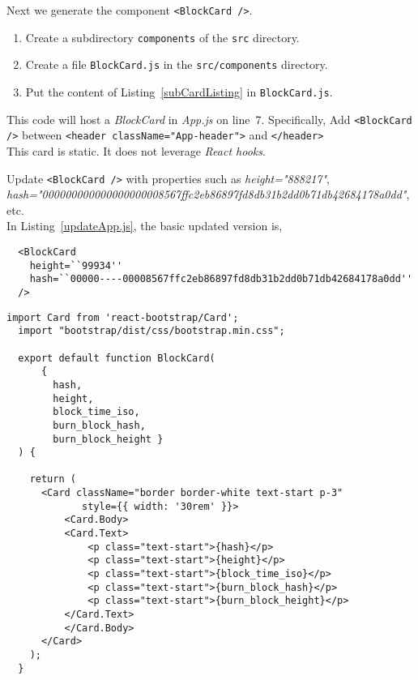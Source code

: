 \documentclass[12pt]{article}
\begin{document}
Next we generate the component \lstinline[style=JSES6Base]|<BlockCard />|.

\begin{enumerate}

  \item Create a subdirectory \lstinline[language=bash]|components| of the \lstinline[language=bash]|src| directory.
  
  \item Create a file \lstinline[language=bash]|BlockCard.js| in the \lstinline[language=bash]|src/components| directory.

  \item Put the content of Listing~\ref{subCardListing} in \lstinline[language=bash]|BlockCard.js|.

\end{enumerate}


This code will host a {\em BlockCard} in {\em App.js} on line~7. 
Specifically, 
Add \lstinline[style=JSES6Base]|<BlockCard />| between \lstinline[style=JSES6Base]|<header className="App-header">|  and  \lstinline[style=JSES6Base]|</header>|\\

This card is static. 
It does not leverage {\em React hooks}.


Update \lstinline[style=JSES6Base]|<BlockCard />| with properties such as 
{\em height="888217"}, \\
{\em hash="000000000000000000008567ffc2eb86897fd8db31b2dd0b71db42684178a0dd"}, 
etc.\\

In Listing~\ref{updateApp.js}, the basic updated version is,\\

\begin{lstlisting}
  <BlockCard
    height=``99934''
    hash=``00000----00008567ffc2eb86897fd8db31b2dd0b71db42684178a0dd''
  />
\end{lstlisting}


%
%
\pagebreak
%
%
%
\begin{lstlisting}[label=subCardListing,style=JSES6Base, caption={Basic Static Card from React-bootstrap}]
  import Card from 'react-bootstrap/Card';
  import "bootstrap/dist/css/bootstrap.min.css";
  
  export default function BlockCard(
      { 
        hash,
        height,
        block_time_iso,
        burn_block_hash,
        burn_block_height }
  ) {
  
    return (
      <Card className="border border-white text-start p-3" 
             style={{ width: '30rem' }}>
          <Card.Body>
          <Card.Text>
              <p class="text-start">{hash}</p>
              <p class="text-start">{height}</p>
              <p class="text-start">{block_time_iso}</p>
              <p class="text-start">{burn_block_hash}</p> 
              <p class="text-start">{burn_block_height}</p>
          </Card.Text>
          </Card.Body>
      </Card>
    );
  }
\end{lstlisting}
\end{document}
